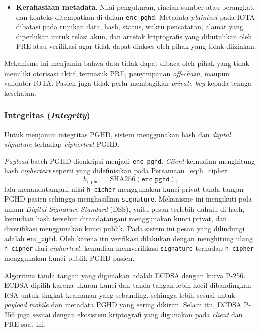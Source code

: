 \begin{itemize}
	\item \textbf{Kerahasiaan metadata}.
	      Nilai pengukuran, rincian sumber atau perangkat, dan konteks ditempatkan di dalam \texttt{enc\_pghd}.
	      Metadata \textit{plaintext} pada IOTA dibatasi pada rujukan data, hash, status, waktu pencatatan, alamat yang diperlukan untuk relasi akun, dan artefak kriptografis yang dibutuhkan oleh PRE atau verifikasi agar tidak dapat diakses oleh pihak yang tidak diizinkan.
\end{itemize}

Mekanisme ini menjamin bahwa data tidak dapat dibaca oleh pihak yang tidak memiliki otorisasi aktif, termasuk PRE, penyimpanan \textit{off-chain}, maupun validator IOTA\@.
Pasien juga tidak perlu membagikan \textit{private key} kepada tenaga kesehatan.

\subsubsection{Integritas (\textit{Integrity})}

Untuk menjamin integritas PGHD, sistem menggunakan hash dan \textit{digital signature} terhadap \textit{ciphertext} PGHD\@.

\textit{Payload} batch PGHD dienkripsi menjadi \texttt{enc\_pghd}. 
\textit{Client} kemudian menghitung hash \textit{ciphertext} seperti yang didefinisikan pada Persamaan~\ref{eq:h_cipher}.
\begin{equation}
	h_{\text{cipher}} = \mathrm{SHA256}(\texttt{enc\_pghd}), \label{eq:h_cipher}
\end{equation}
lalu menandatangani nilai \texttt{h\_cipher} menggunakan kunci privat tanda tangan PGHD pasien sehingga menghasilkan \texttt{signature}.
Mekanisme ini mengikuti pola umum \textit{Digital Signature Standard} (DSS), yaitu pesan terlebih dahulu di-hash, kemudian hash tersebut ditandatangani menggunakan kunci privat, dan diverifikasi menggunakan kunci publik.
Pada sistem ini pesan yang dilindungi adalah \texttt{enc\_pghd}.
Oleh karena itu verifikasi dilakukan dengan menghitung ulang \texttt{h\_cipher} dari \textit{ciphertext}, kemudian memverifikasi \texttt{signature} terhadap \texttt{h\_cipher} menggunakan kunci publik PGHD pasien.

Algoritma tanda tangan yang digunakan adalah ECDSA dengan kurva P-256.
ECDSA dipilih karena ukuran kunci dan tanda tangan lebih kecil dibandingkan RSA untuk tingkat keamanan yang sebanding, sehingga lebih sesuai untuk \textit{payload} \textit{mobile} dan metadata PGHD yang sering dikirim.
Selain itu, ECDSA P-256 juga sesuai dengan ekosistem kriptografi yang digunakan pada \textit{client} dan PRE saat ini\@.

